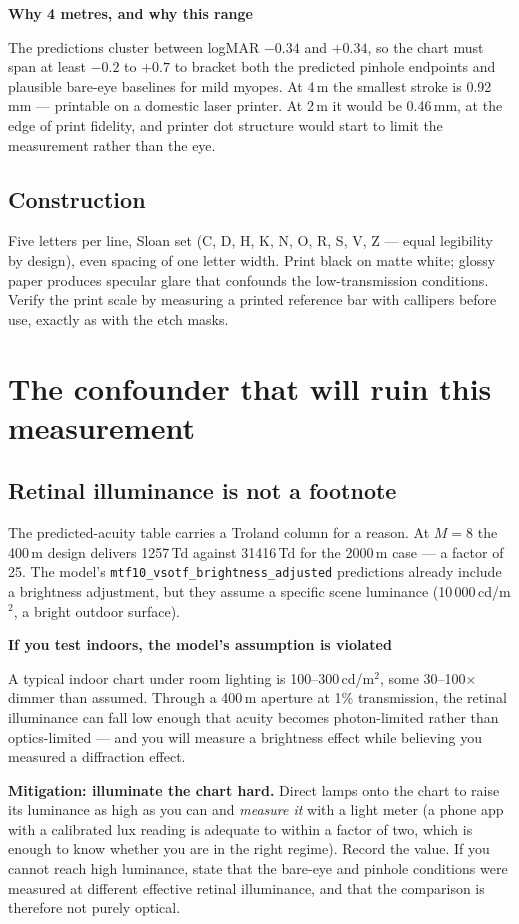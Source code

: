 \documentclass[11pt]{report}
\newenvironment{keybox}[1]%
{\par\vspace{8pt}\begin{lrbox}{\kbsave}\begin{minipage}{0.88\textwidth}%
{\bfseries\color{hbblue}#1}\par\vspace{4pt}\ignorespaces}%
{\end{minipage}\end{lrbox}%
\begin{center}\setlength{\fboxrule}{1.2pt}\setlength{\fboxsep}{8pt}%
\fcolorbox{hbblue}{boxgrey}{\usebox{\kbsave}}\end{center}\vspace{8pt}\par}
\newenvironment{warnbox}[1]%
{\par\vspace{8pt}\begin{lrbox}{\wbsave}\begin{minipage}{0.88\textwidth}%
{\bfseries\color{warnred}#1}\par\vspace{4pt}\ignorespaces}%
{\end{minipage}\end{lrbox}%
\begin{center}\setlength{\fboxrule}{1.2pt}\setlength{\fboxsep}{8pt}%
\fcolorbox{warnred}{white}{\usebox{\wbsave}}\end{center}\vspace{8pt}\par}
\begin{document}
\begin{keybox}{Why 4 metres, and why this range}
The predictions cluster between logMAR $-0.34$ and $+0.34$, so the chart must span at least
$-0.2$ to $+0.7$ to bracket both the predicted pinhole endpoints and plausible bare-eye baselines
for mild myopes. At 4\,m the smallest stroke is 0.92\,mm --- printable on a domestic laser printer.
At 2\,m it would be 0.46\,mm, at the edge of print fidelity, and printer dot structure would start
to limit the measurement rather than the eye.
\end{keybox}

\section{Construction}

Five letters per line, Sloan set (C, D, H, K, N, O, R, S, V, Z --- equal legibility by design), even
spacing of one letter width. Print black on matte white; glossy paper produces specular glare that
confounds the low-transmission conditions. Verify the print scale by measuring a printed reference
bar with callipers before use, exactly as with the etch masks.

\chapter{The confounder that will ruin this measurement}

\section{Retinal illuminance is not a footnote}

The predicted-acuity table carries a Troland column for a reason. At $M=8$ the 400\,\textmu m design
delivers 1257\,Td against 31416\,Td for the 2000\,\textmu m case --- a factor of 25. The model's
\texttt{mtf10\_vsotf\_brightness\_adjusted} predictions already include a brightness adjustment, but
they assume a specific scene luminance (10\,000\,cd/m$^2$, a bright outdoor surface).

\begin{warnbox}{If you test indoors, the model's assumption is violated}
A typical indoor chart under room lighting is 100--300\,cd/m$^2$, some 30--100$\times$ dimmer than
assumed. Through a 400\,\textmu m aperture at 1\% transmission, the retinal illuminance can fall low
enough that acuity becomes photon-limited rather than optics-limited --- and you will measure a
brightness effect while believing you measured a diffraction effect.

\textbf{Mitigation: illuminate the chart hard.} Direct lamps onto the chart to raise its luminance as
high as you can and \emph{measure it} with a light meter (a phone app with a calibrated lux reading is
adequate to within a factor of two, which is enough to know whether you are in the right regime).
Record the value. If you cannot reach high luminance, state that the bare-eye and pinhole conditions
were measured at different effective retinal illuminance, and that the comparison is therefore not
purely optical.
\end{warnbox}
\end{document}
